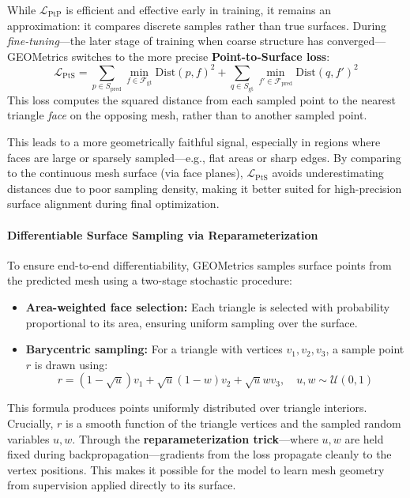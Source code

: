 \begin{enrichment}
    While \( \mathcal{L}_{\text{PtP}} \) is efficient and effective early in training, it remains an approximation: it compares discrete samples rather than true surfaces. During \emph{fine-tuning}—the later stage of training when coarse structure has converged—GEOMetrics switches to the more precise \textbf{Point-to-Surface loss}:
    \[
    \mathcal{L}_{\text{PtS}} = \sum_{p \in S_{\text{pred}}} \min_{f \in \mathcal{F}_{\text{gt}}} \text{Dist}(p, f)^2 + \sum_{q \in S_{\text{gt}}} \min_{f' \in \mathcal{F}_{\text{pred}}} \text{Dist}(q, f')^2
    \]
    This loss computes the squared distance from each sampled point to the nearest triangle \emph{face} on the opposing mesh, rather than to another sampled point. 
    
    \newpage
    
    This leads to a more geometrically faithful signal, especially in regions where faces are large or sparsely sampled—e.g., flat areas or sharp edges. By comparing to the continuous mesh surface (via face planes), \( \mathcal{L}_{\text{PtS}} \) avoids underestimating distances due to poor sampling density, making it better suited for high-precision surface alignment during final optimization.
    
    \paragraph{Differentiable Surface Sampling via Reparameterization}
    
    To ensure end-to-end differentiability, GEOMetrics samples surface points from the predicted mesh using a two-stage stochastic procedure:
    \begin{itemize}
        \item \textbf{Area-weighted face selection:} Each triangle is selected with probability proportional to its area, ensuring uniform sampling over the surface.
        \item \textbf{Barycentric sampling:} For a triangle with vertices \( v_1, v_2, v_3 \), a sample point \( r \) is drawn using:
        \[
        r = (1 - \sqrt{u}) v_1 + \sqrt{u}(1 - w) v_2 + \sqrt{u} w v_3, \quad u, w \sim \mathcal{U}(0, 1)
        \]
    \end{itemize}
    This formula produces points uniformly distributed over triangle interiors. Crucially, \( r \) is a smooth function of the triangle vertices and the sampled random variables \( u, w \). Through the \textbf{reparameterization trick}—where \( u, w \) are held fixed during backpropagation—gradients from the loss propagate cleanly to the vertex positions. This makes it possible for the model to learn mesh geometry from supervision applied directly to its surface.
    

\end{enrichment}
